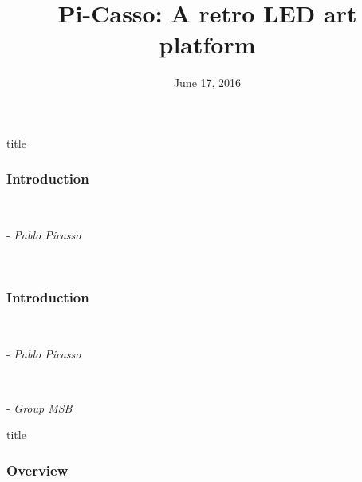 \documentclass{beamer}
\title[Pi-Casso]{Pi-Casso: A retro LED art platform} %
\author[Group MSB]{}%
\institute[ICL] %
{
Imperial College London \\ %
\medskip
}
\date{June 17, 2016} %
\begin{document}
\begin{frame}
  \vfill
  \centering
  \begin{beamercolorbox}[sep=8pt,center,shadow=true,rounded=true]{title}
    \insertsectionhead\par%
  \end{beamercolorbox}
  \vfill
\end{frame}

\begin{frame}
\frametitle{Introduction} 
 
\\
\begin{flushright}
{- \textit{Pablo Picasso }}
\end{flushright}
\text{ }\\
\begin{flushright}
{ \textit{ }}
\end{flushright}
\end{frame}

\begin{frame}
\frametitle{Introduction} 
 
\\
\begin{flushright}
{- \textit{Pablo Picasso }}
\end{flushright}
\\

\begin{flushright}
{- \textit{Group MSB}}
\end{flushright}

\end{frame}

\begin{frame}
  \vfill
  \centering
  \begin{beamercolorbox}[sep=8pt,center,shadow=true,rounded=true]{title}
    \insertsectionhead\par%
  \end{beamercolorbox}
  \vfill
\end{frame}


\begin{frame}
\frametitle{Overview} %
\tableofcontents %
\end{frame}
\end{document}
